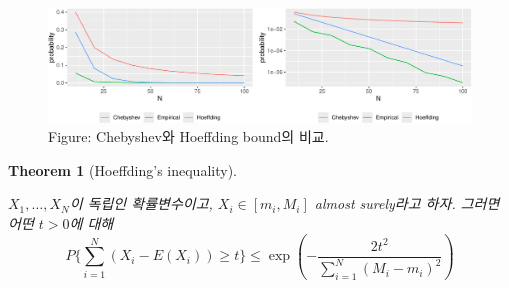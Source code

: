 \documentclass[
  letterpaper,
  DIV=11,
  numbers=noendperiod]{scrreprt}
\theoremstyle{definition}
\theoremstyle{plain}
\newtheorem{theorem}{Theorem}[chapter]
\theoremstyle{plain}
\theoremstyle{definition}
\theoremstyle{plain}
\theoremstyle{definition}
\theoremstyle{remark}
\begin{document}
\begin{figure}[H]

{\centering \includegraphics[width=0.7\linewidth,height=\textheight,keepaspectratio]{ineq_files/figure-pdf/unnamed-chunk-4-1.pdf}

}

\caption{Figure: Chebyshev와 Hoeffding bound의 비교.}

\end{figure}%

\begin{theorem}[Hoeffding's
inequality]\protect\hypertarget{thm-hoeffdingineq}{}\label{thm-hoeffdingineq}

\(X_1, \ldots, X_N\)이 독립인 확률변수이고, \(X_i \in [m_i, M_i]\)
almost surely라고 하자. 그러면 어떤 \(t>0\)에 대해 \[
P \{\sum_{i=1}^N (X_i - E(X_i))\geq t \} \leq \exp (- \frac{2t^2}{\sum_{i=1}^N (M_i - m_i)^2})
\]

\end{theorem}
\end{document}
